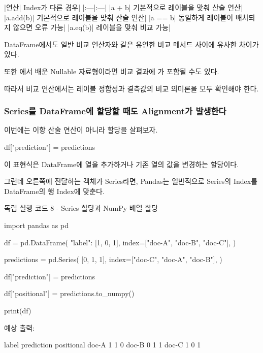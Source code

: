 \begin{dhktable}
|연산|	Index가 다른 경우|
|:---|:---|
|a + b|	기본적으로 레이블을 맞춰 산술 연산|
|a.add(b)|	기본적으로 레이블을 맞춰 산술 연산|
|a == b|	동일하게 레이블이 배치되지 않으면 오류 가능|
|a.eq(b)|	레이블을 맞춰 비교 가능|
\end{dhktable}

DataFrame에서도 일반 비교 연산자와  같은 유연한 비교 메서드 사이에 유사한 차이가 있다.

또한 에서 배운 Nullable 자료형이라면 비교 결과에 가 포함될 수도 있다.

따라서 비교 연산에서는 레이블 정합성과 결측값의 비교 의미론을 모두 확인해야 한다.

\subsubsection{Series를 DataFrame에 할당할 때도 Alignment가 발생한다}

이번에는 이항 산술 연산이 아니라 할당을 살펴보자.

\begin{dhkcode}
df["prediction"] = predictions
\end{dhkcode}

이 표현식은 DataFrame에 열을 추가하거나 기존 열의 값을 변경하는 할당이다.

그런데 오른쪽에 전달하는 객체가 Series라면, Pandas는 일반적으로 Series의 Index를 DataFrame의 행 Index에 맞춘다.

\begin{dhknote}
\begin{dhksmry}[centered]
독립 실행 코드 8 - Series 할당과 NumPy 배열 할당
\end{dhksmry}
\end{dhknote}

\begin{dhkcode}
import pandas as pd

df = pd.DataFrame(
    {"label": [1, 0, 1]},
    index=["doc-A", "doc-B", "doc-C"],
)

predictions = pd.Series(
    [0, 1, 1],
    index=["doc-C", "doc-A", "doc-B"],
)

df["prediction"] = predictions

df["positional"] = predictions.to_numpy()

print(df)
\end{dhkcode}

예상 출력:

\begin{dhkzsh}
       label  prediction  positional
doc-A      1           1           0
doc-B      0           1           1
doc-C      1           0           1
\end{dhkzsh}

